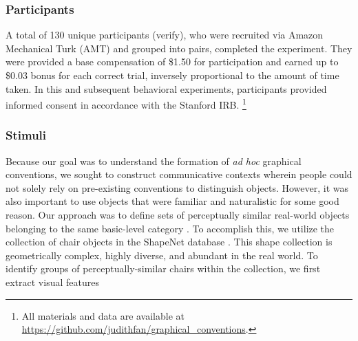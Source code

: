 \documentclass[10pt,letterpaper]{article}
\begin{document}
\subsubsection{Participants}
A total of 130 unique participants (verify), who were recruited via Amazon Mechanical Turk (AMT) and grouped into pairs, completed the experiment. They were provided a base compensation of \$1.50 for participation and earned up to \$0.03 bonus for each correct trial, inversely proportional to the amount of time taken. In this and subsequent behavioral experiments, participants provided informed consent in accordance with the Stanford IRB.
\footnote{All materials and data are available at \url{https://github.com/judithfan/graphical_conventions}.}

\subsubsection{Stimuli}
Because our goal was to understand the formation of \textit{ad hoc} graphical conventions, we sought to construct communicative contexts wherein people could not solely rely on pre-existing conventions to distinguish objects. 
However, it was also important to use objects that were familiar and naturalistic for some good reason.
Our approach was to define sets of perceptually similar real-world objects belonging to the same basic-level category \cite{MervisRosch81_CategorizationReview}.
To accomplish this, we utilize the collection of chair objects in the ShapeNet database \cite{chang2015shapenet}. 
This shape collection is  geometrically complex, highly diverse, and abundant in the real world. 
To identify groups of perceptually-similar chairs within the collection, we first extract visual features 

\cite{simonyan2014very}

\end{document}
